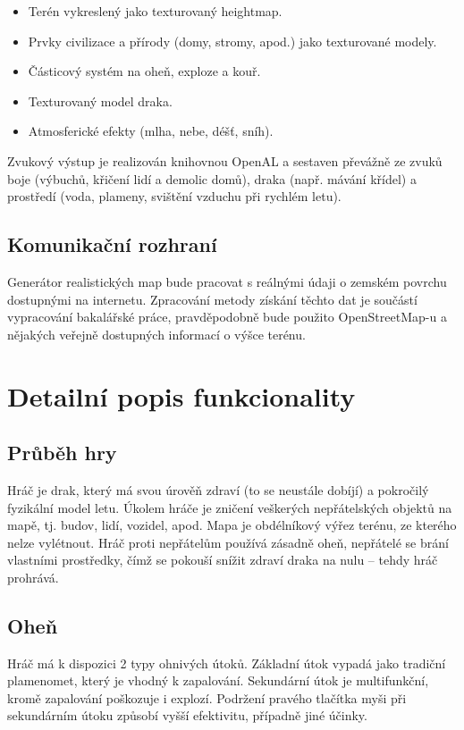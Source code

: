 \documentclass{article}
\begin{document}
\begin{itemize}
\item Terén vykreslený jako texturovaný heightmap.
\item Prvky civilizace a přírody (domy, stromy, apod.) jako texturované modely.
\item Částicový systém na oheň, exploze a kouř.
\item Texturovaný model draka.
\item Atmosferické efekty (mlha, nebe, déšť, sníh).
\end{itemize}

Zvukový výstup je realizován knihovnou OpenAL a sestaven převážně ze zvuků boje (výbuchů, křičení lidí a demolic domů), draka (např. mávání křídel) a prostředí (voda, plameny, svištění vzduchu při rychlém letu).

\subsection{Komunikační rozhraní}

Generátor realistických map bude pracovat s reálnými údaji o zemském povrchu dostupnými na internetu. Zpracování metody získání těchto dat je součástí vypracování bakalářské práce, pravděpodobně bude použito OpenStreetMap-u a nějakých veřejně dostupných informací o výšce terénu.

\section{Detailní popis funkcionality}

\subsection{Průběh hry}

Hráč je drak, který má svou úrověň zdraví (to se neustále dobíjí) a pokročilý fyzikální model letu. Úkolem hráče je zničení veškerých nepřátelských objektů na mapě, tj. budov, lidí, vozidel, apod. Mapa je obdélníkový výřez terénu, ze kterého nelze vylétnout. Hráč proti nepřátelům používá zásadně oheň, nepřátelé se brání vlastními prostředky, čímž se pokouší snížit zdraví draka na nulu -- tehdy hráč prohrává.

\subsection{Oheň}

Hráč má k dispozici 2 typy ohnivých útoků. Základní útok vypadá jako tradiční plamenomet, který je vhodný k zapalování. Sekundární útok je multifunkční, kromě zapalování poškozuje i explozí. Podržení pravého tlačítka myši při sekundárním útoku způsobí vyšší efektivitu, případně jiné účinky.
\end{document}
